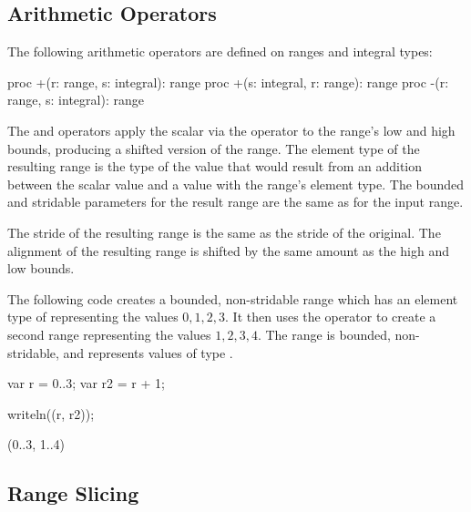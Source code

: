 \subsection{Arithmetic Operators}
\label{Range_Arithmetic}

The following arithmetic operators are defined on ranges and integral
types:

\begin{chapel}
proc +(r: range, s: integral): range
proc +(s: integral, r: range): range
proc -(r: range, s: integral): range
\end{chapel}

The \chpl{+} and \chpl{-} operators apply the scalar via the operator
to the range's low and high bounds, producing a shifted version of the
range.  The element type of the resulting range is the type of the value
that would result from an addition between the scalar value and a value
with the range's element type.  The bounded and stridable parameters for
the result range are the same as for the input range.

The stride of the resulting range is the same as the stride of the
original. The alignment of the resulting range is shifted by the same amount as
the high and low bounds.

\begin{example}
The following code creates a bounded, non-stridable range 
which has an element type of  representing the values ${0,
  1, 2, 3}$.  It then uses the \chpl{+} operator to
create a second range  representing the values ${1, 2, 3,
  4}$.  The  range is bounded, non-stridable, and represents
values of type .
\begin{chapelpre}
\end{chapelpre}
\begin{chapel}
var r = 0..3;
var r2 = r + 1;
\end{chapel}
\begin{chapelpost}
writeln((r, r2));
\end{chapelpost}
\begin{chapeloutput}
(0..3, 1..4)
\end{chapeloutput}
\end{example}


\subsection{Range Slicing}
\label{Range_Slicing}


